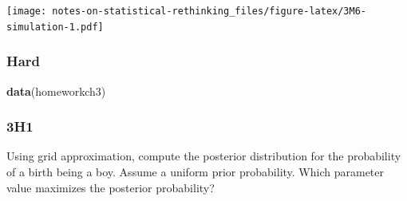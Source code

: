 \documentclass[
]{book}
\newenvironment{Shaded}{\begin{snugshade}}{\end{snugshade}}
\newcommand{\KeywordTok}[1]{\textcolor[rgb]{0.13,0.29,0.53}{\textbf{#1}}}
\newcommand{\NormalTok}[1]{#1}
\begin{document}
\texttt{[image: notes-on-statistical-rethinking\_files/figure-latex/3M6-simulation-1.pdf]}

\hypertarget{hard}{%
\subsubsection*{Hard}\label{hard}}

\begin{Shaded}
\begin{Highlighting}[]
\KeywordTok{data}\NormalTok{(homeworkch3)}
\end{Highlighting}
\end{Shaded}

\hypertarget{h1-1}{%
\subsubsection*{3H1}\label{h1-1}}

Using grid approximation, compute the posterior distribution for the probability of a birth being a boy. Assume a uniform prior probability. Which parameter value maximizes the posterior probability?
\end{document}
